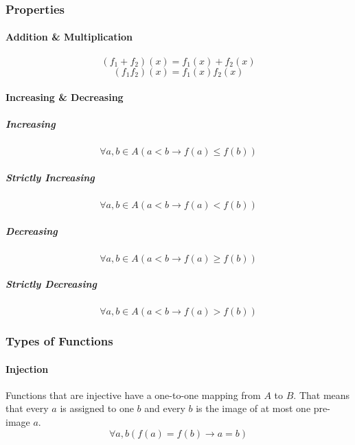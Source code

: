 \documentclass[a4paper, 10pt]{article}
\begin{document}
\subsubsection{Properties}
\paragraph{Addition \& Multiplication}
\[ (f_1 + f_2)(x) = f_1(x) + f_2(x) \]
\[ (f_1 f_2)(x) = f_1(x) f_2(x) \]
\paragraph{Increasing \& Decreasing}
\subparagraph{Increasing}
\[ \forall a,b\in A\left(a<b\rightarrow f(a)\leq f(b)\right) \]
\subparagraph{Strictly Increasing}
\[ \forall a,b\in A\left(a<b\rightarrow f(a)< f(b)\right) \]
\subparagraph{Decreasing}
\[ \forall a,b\in A\left(a<b\rightarrow f(a)\geq f(b)\right) \]
\subparagraph{Strictly Decreasing}
\[ \forall a,b\in A\left(a<b\rightarrow f(a)> f(b)\right) \]

\subsubsection{Types of Functions}
\paragraph{Injection}
Functions that are injective have a one-to-one mapping from \(A\) to \(B\). That means that every \(a\) is assigned to one \(b\) and every \(b\) is the image of at most one pre-image \(a\).
\[ \forall a,b(f(a)=f(b)\rightarrow a=b) \]
\begin{center}
\end{center}
\end{document}
